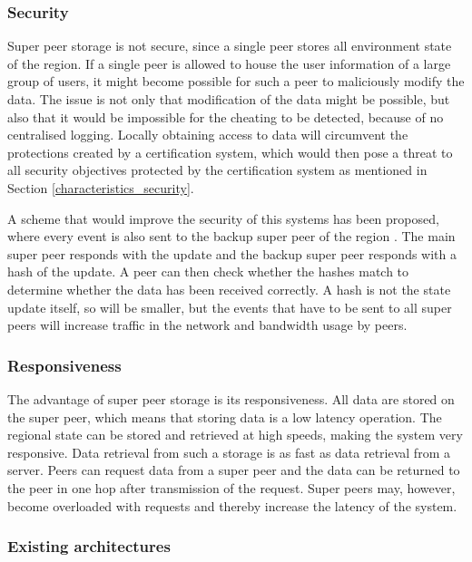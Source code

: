 \subsubsection{Security}

Super peer storage is not secure, since a single peer stores all environment state of the region. If a single peer is allowed to house the user information of a large group of users, it might become possible for such a peer to maliciously modify the data. The issue is not only that modification of the data might be possible, but also that it would be impossible for the cheating to be detected, because of no centralised logging. Locally obtaining access to data will circumvent the protections created by a certification system, which would then pose a threat to all security objectives protected by the certification system as mentioned in Section \ref{characteristics_security}.

A scheme that would improve the security of this systems has been proposed, where every event is also sent to the backup super peer of the region \cite{past_storage_focus}. The main super peer responds with the update and the backup super peer responds with a hash of the update. A peer can then check whether the hashes match to determine whether the data has been received correctly. A hash is not the state update itself, so will be smaller, but the events that have to be sent to all super peers will increase traffic in the network and bandwidth usage by peers.

\subsubsection{Responsiveness}
The advantage of super peer storage is its responsiveness. All data are stored on the super peer, which means that storing data is a low latency operation. The regional state can be stored and retrieved at high speeds, making the system very responsive. Data retrieval from such a storage is as fast as data retrieval from a server. Peers can request data from a super peer and the data can be returned to the peer in one hop after transmission of the request. Super peers may, however, become overloaded with requests and thereby increase the latency of the system.

\subsubsection{Existing architectures}
\label{super_peer_storage_rel_arhcs}

